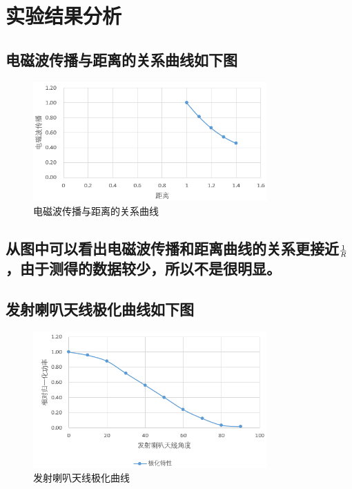 \documentclass{../source/Experiment}
\begin{document}
    \section{实验结果分析}
        \subsection{电磁波传播与距离的关系曲线如下图}

        \begin{figure}[H]
            \centering
            \includegraphics[width = 0.8\textwidth]{pic/电磁波传播与距离的关系曲线.png}
            \caption{电磁波传播与距离的关系曲线}
        \end{figure}

        \subsection{从图中可以看出电磁波传播和距离曲线的关系更接近$1\over R$，由于测得的数据较少，所以不是很明显。}
        
        

        \subsection{发射喇叭天线极化曲线如下图}
        

        \begin{figure}[H]
            \centering
            \includegraphics[width = 0.8\textwidth]{pic/发射喇叭天线极化曲线.png}
            \caption{发射喇叭天线极化曲线}
        \end{figure}
\end{document}
